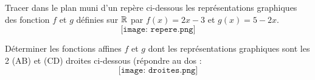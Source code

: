 \documentclass[a4paper,11pt,DIV12,BCOR2mm]{scrartcl}
\begin{document}
\begin{exercice}
 Tracer dans le plan muni d'un repère ci-dessous les représentations graphiques des fonction 
$f$ et $g$ définies sur $\mathbb{R}$ par $f(x)=2x-3$ et $g(x)=5-2x$.
\[
 \texttt{[image: repere.png]}
\]

\end{exercice}
\begin{exercice}
 Déterminer les fonctions affines $f$ et $g$ dont les représentations graphiques sont les 2 (AB) et (CD) droites ci-dessous
(répondre au dos :
\[
 \texttt{[image: droites.png]}
\]
\end{exercice}
\end{document}
